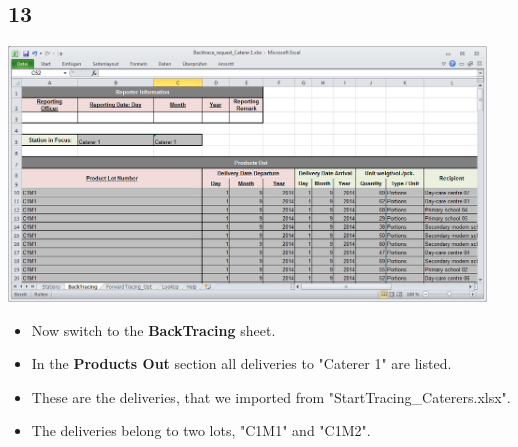\documentclass{beamer}
\begin{document}
\subsection{13}
\begin{frame}
	\begin{center}
  		\includegraphics[width=0.95\textwidth]{13.png}
	\end{center}
	\begin{itemize}
		\item Now switch to the \textbf{BackTracing} sheet.
		\item In the \textbf{Products Out} section all deliveries to "Caterer 1" are listed.
		\item These are the deliveries, that we imported from "StartTracing\_Caterers.xlsx".
		\item The deliveries belong to two lots, "C1M1" and "C1M2".
	\end{itemize}
\end{frame}
\end{document}
